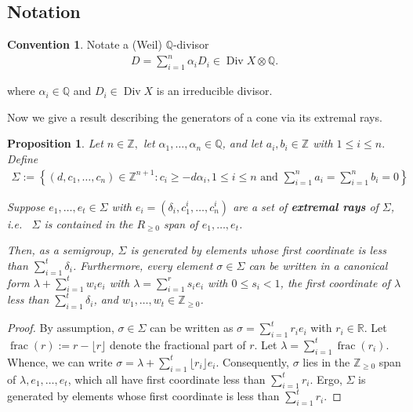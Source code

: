 \documentclass{amsart}
\theoremstyle{plain}
\newtheorem{prop}[thm]{Proposition}
\theoremstyle{definition}
\newtheorem{convention}[thm]{Convention}
\theoremstyle{remark}
\numberwithin{equation}{section}
\newcommand\ssec{\subsection}
\newcommand\br{{\mathbb R}}
\newcommand\bq{{\mathbb Q}}
\newcommand\bz{{\mathbb Z}}
\DeclareMathOperator\di{Div}
\newcommand\pdeg{\delta}
\DeclareMathOperator{\fr}{frac}
\begin{document}
\ssec{Notation}
\begin{convention}
Notate a (Weil) $\bq$-divisor
\begin{align*}
	D = \sum_{i=1}^{n}\alpha_i D_i \in \di X \otimes \bq.
\end{align*}

\noindent
where $\alpha_i \in \bq$ and $D_i \in \di X$ is an irreducible divisor.
\end{convention}

Now we give a result describing the generators of a cone via its
extremal rays.

\begin{prop}
\label{prop:cone-generation}
Let $n \in \bz,$ let $\alpha_1, \ldots, \alpha_n \in \bq$, and let
$a_i, b_i \in \bz$ with $1 \leq i \leq n.$ Define
\begin{align*}
	\Sigma := \left \{(d, c_1, \ldots, c_n) \in \bz^{n + 1} : c_i \geq -
	d \alpha_i, 1 \leq i \leq n \text{ and } \sum_{i = 1}^{n} a_i =
	\sum_{i	= 1}^{n}b_i = 0 \right \}
\end{align*}

\noindent
Suppose $e_1, \ldots, e_t \in \Sigma$ with $e_i = (\pdeg_i, c_1^i,
\ldots, c_n^i)$ are a set of {\bf extremal rays} of $\Sigma$,
i.e.~ $\Sigma$ is contained in the $R_{\geq 0}$ span of
$e_1, \ldots, e_t$.

Then, as a semigroup, $\Sigma$ is generated by
elements whose first coordinate is less than $\sum_{i = 1}^{t}
\pdeg_i$. Furthermore, every element $\sigma \in \Sigma$ can be
written in a canonical form $\lambda + \sum_{i = 1}^{t} w_i e_i$ 
with $\lambda = \sum_{i = 1}^{r} s_i e_i$ with $0 \leq s_i < 1$, the
first coordinate of $\lambda$ less than $\sum_{i=1}^{t}\pdeg_i$,
and $w_1, \ldots, w_t \in \bz_{\geq 0}$.
\end{prop}

\begin{proof}
By assumption, $\sigma \in \Sigma$ can be written as $\sigma = \sum_
{i = 1}^{t} r_i e_i$ with $r_i \in \br$. Let $\fr(r) := r - \lfloor r
\rfloor$ denote the fractional part of $r$. Let $\lambda = \sum_{i = 1}
^{t} \fr(r_i)$. Whence, we can write $\sigma = \lambda + \sum_{i = 1}
^{t} \lfloor r_i \rfloor e_i.$ Consequently, $\sigma$ lies in the
$\bz_{\geq 0}$ span of $\lambda, e_1, \ldots, e_t$, which all have
first coordinate less than $\sum_{i=1}^{t} r_i$. Ergo, $\Sigma$ is
generated by elements whose first coordinate is less than
$\sum_{i = 1}^{t} r_i$.
\end{proof}
\end{document}
